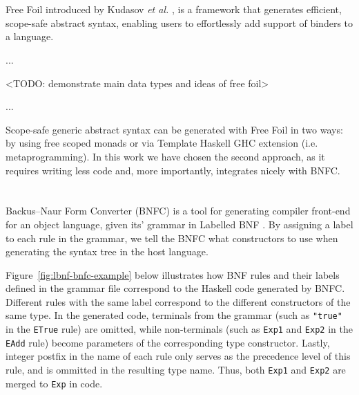 
\section{}

Free Foil introduced by Kudasov \textit{et al.} \cite{FreeFoil}, is a framework that generates efficient, scope-safe abstract syntax, enabling users to effortlessly add support of binders to a language.

...

<TODO: demonstrate main data types and ideas of free foil>

...

Scope-safe generic abstract syntax can be generated with Free Foil in two ways: by using free scoped monads or via Template Haskell \cite{SheardPeytonJones2002_TH} GHC extension (i.e. metaprogramming). In this work we have chosen the second approach, as it requires writing less code and, more importantly, integrates nicely with BNFC.


\section{}

Backus–Naur Form Converter (BNFC) \cite{BNFC} is a tool for generating compiler front-end for an object language, given its' grammar in Labelled BNF \cite{BackusNaurForm2003}. By assigning a label to each rule in the grammar, we tell the BNFC what constructors to use when generating the syntax tree in the host language.

Figure~\ref{fig:lbnf-bnfc-example} below illustrates how BNF rules and their labels defined in the grammar file correspond to the Haskell code generated by BNFC. Different rules with the same label correspond to the different constructors of the same type. In the generated code, terminals from the grammar (such as \texttt{"true"} in the \texttt{ETrue} rule) are omitted, while non-terminals (such as \texttt{Exp1} and \texttt{Exp2} in the \texttt{EAdd} rule) become parameters of the corresponding type constructor. Lastly, integer postfix in the name of each rule only serves as the precedence level of this rule, and is ommitted in the resulting type name. Thus, both \texttt{Exp1} and \texttt{Exp2} are merged to \texttt{Exp} in code.


